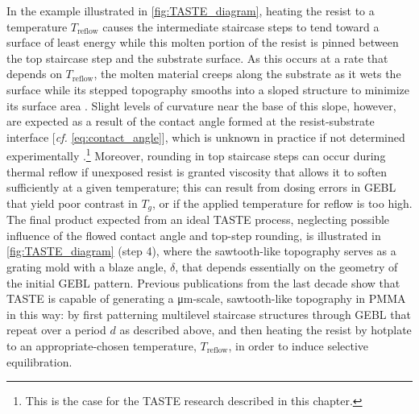 In the example illustrated in \cref{fig:TASTE_diagram}, heating the resist to a temperature $T_{\text{reflow}}$ causes the intermediate staircase steps to tend toward a surface of least energy while this molten portion of the resist is pinned between the top staircase step and the substrate surface. 
As this occurs at a rate that depends on $T_{\text{reflow}}$, the molten material creeps along the substrate as it wets the surface while its stepped topography smooths into a sloped structure to minimize its surface area \cite{Schleunitz10,Schleunitz14,Kirchner19}. 
Slight levels of curvature near the base of this slope, however, are expected as a result of the contact angle formed at the resist-substrate interface [\emph{cf.\@} \cref{eq:contact_angle}], which is unknown in practice if not determined experimentally \cite{Kirchner14,Kirchner14a}.\footnote{This is the case for the TASTE research described in this chapter.} 
Moreover, rounding in top staircase steps can occur during thermal reflow if unexposed resist is granted viscosity that allows it to soften sufficiently at a given temperature; this can result from dosing errors in GEBL that yield poor contrast in $T_g$, or if the applied temperature for reflow is too high. 
The final product expected from an ideal TASTE process, neglecting possible influence of the flowed contact angle and top-step rounding, is illustrated in \cref{fig:TASTE_diagram} (step 4), where the sawtooth-like topography serves as a grating mold with a blaze angle, $\delta$, that depends essentially on the geometry of the initial GEBL pattern. 
Previous publications from the last decade \cite{Schleunitz10,Schleunitz11a,Schleunitz11b,Schleunitz14} show that TASTE is capable of generating a \si{\um}-scale, sawtooth-like topography in PMMA in this way: by first patterning multilevel staircase structures through GEBL that repeat over a period $d$ as described above, and then heating the resist by hotplate to an appropriate-chosen temperature, $T_{\text{reflow}}$, in order to induce selective equilibration. 

